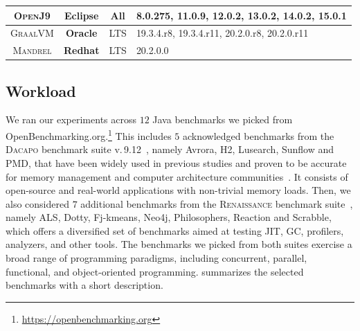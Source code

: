 \begin{table}
{\begin{tabular}{|c|c|c|l|}
            \hline
            \textsc{OpenJ9}       & \textbf{Eclipse}        & {\sc All}        & 8.0.275, 11.0.9, 12.0.2, 13.0.2, 14.0.2, 15.0.1                          \\
            \hline
            \textsc{GraalVM}      & \textbf{Oracle}         & LTS              & 19.3.4.r8, 19.3.4.r11, 20.2.0.r8, 20.2.0.r11                             \\
            \hline
            \textsc{Mandrel}      & \textbf{Redhat}         & LTS              & 20.2.0.0                                                                 \\
            \hline
        \end{tabular}
    }
\end{table}

\subsection{Workload}
We ran our experiments across $12$ Java benchmarks we picked from \textsf{OpenBenchmarking.org}.\footnote{\url{https://openbenchmarking.org}}
This includes $5$ acknowledged benchmarks from the \textsc{Dacapo} benchmark suite v.\,9.12~\cite{DaCapo:paper}, namely \textsf{Avrora}, \textsf{H2}, \textsf{Lusearch}, \textsf{Sunflow} and \textsf{PMD}, that have been widely used in previous studies and proven to be accurate for memory management and computer architecture communities~\cite{DBLP:conf/wosp/LengauerBMW17,DBLP:conf/oopsla/KaliberaMJV12}.
It consists of open-source and real-world applications with non-trivial memory loads.
% 
Then, we also considered $7$ additional benchmarks from the \textsc{Renaissance} benchmark suite~\cite{renaissance,DBLP:conf/pldi/ProkopecRLD0SBZ19}, namely \textsf{ALS}, \textsf{Dotty}, \textsf{Fj-kmeans}, \textsf{Neo4j}, \textsf{Philosophers}, \textsf{Reaction} and \textsf{Scrabble}, which offers a diversified set of benchmarks aimed at testing JIT, GC, profilers, analyzers, and other tools.
The benchmarks we picked from both suites exercise a broad range of programming paradigms, including concurrent, parallel, functional, and object-oriented programming.
 summarizes the selected benchmarks with a short description.

